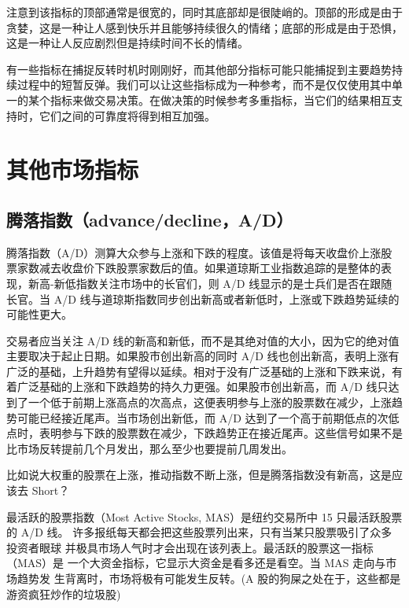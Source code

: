 注意到该指标的顶部通常是很宽的，同时其底部却是很陡峭的。顶部的形成是由于贪婪，这是一种让人感到快乐并且能够持续很久的情绪；底部的形成是由于恐惧，这是一种让人反应剧烈但是持续时间不长的情绪。

有一些指标在捕捉反转时机时刚刚好，而其他部分指标可能只能捕捉到主要趋势持续过程中的短暂反弹。我们可以让这些指标成为一种参考，而不是仅仅使用其中单一的某个指标来做交易决策。在做决策的时候参考多重指标，当它们的结果相互支持时，它们之间的可靠度将得到相互加强。
\section{其他市场指标}
\subsection*{腾落指数（advance/decline，A/D）}
腾落指数（A/D）测算大众参与上涨和下跌的程度。该值是将每天收盘价上涨股票家数减去收盘价下跌股票家数后的值。如果道琼斯工业指数追踪的是整体的表现，新高-新低指数关注市场中的长官们，则 A/D 线显示的是士兵们是否在跟随长官。当 A/D 线与道琼斯指数同步创出新高或者新低时，上涨或下跌趋势延续的可能性更大。

交易者应当关注 A/D 线的新高和新低，而不是其绝对值的大小，因为它的绝对值主要取决于起止日期。如果股市创出新高的同时 A/D 线也创出新高，表明上涨有广泛的基础，上升趋势有望得以延续。相对于没有广泛基础的上涨和下跌来说，有着广泛基础的上涨和下跌趋势的持久力更强。如果股市创出新高，而 A/D 线只达到了一个低于前期上涨高点的次高点，这便表明参与上涨的股票数在减少，上涨趋势可能已经接近尾声。当市场创出新低，而 A/D 达到了一个高于前期低点的次低点时，表明参与下跌的股票数在减少，下跌趋势正在接近尾声。这些信号如果不是比市场反转提前几个月发出，那么至少也要提前几周发出。
\begin{tcolorbox}
    比如说大权重的股票在上涨，推动指数不断上涨，但是腾落指数没有新高，这是应该去 Short？
\end{tcolorbox}

最活跃的股票指数（Most Active Stocks, MAS）是纽约交易所中 15 只最活跃股票的 A/D 线。
许多报纸每天都会把这些股票列出来，只有当某只股票吸引了众多投资者眼球
并极具市场人气时才会出现在该列表上。最活跃的股票这一指标（MAS）是
一个大资金指标，它显示大资金是看多还是看空。当 MAS 走向与市场趋势发
生背离时，市场将极有可能发生反转。(A 股的狗屎之处在于，这些都是游资疯狂炒作的垃圾股)


